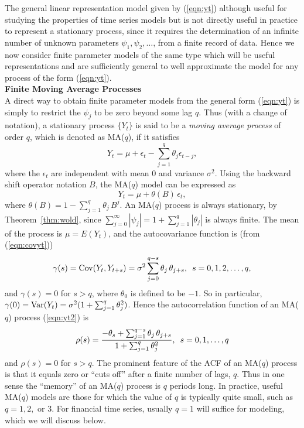 The general linear representation model given by (\ref{eqn:yt}) although useful for studying the properties of time series models but is not directly useful in practice to represent a stationary process, since it requires the determination of an infinite number of unknown parameters $\psi_1,\psi_2, \ldots$, from a finite record of data. Hence we now consider finite parameter models of the same type which will be useful representations and are sufficiently general to well approximate the model for any process of the form (\ref{eqn:yt}). \\


\noindent \textbf{Finite Moving Average Processes} \\


A direct way to obtain finite parameter models from the general form (\ref{eqn:yt}) is simply to restrict the $\psi_j$ to be zero beyond some lag $q$. Thus (with a change of notation), a stationary process $\{Y_t\}$ is said to be a \textit{moving average process} of order $q$, which is denoted as MA($q$), if it satisfies
	\begin{equation}\label{eqn:yt2}
	Y_t = \mu + \epsilon_t - \sum_{j=1}^{q} \theta_j \epsilon_{t-j},
	\end{equation}
where the $\epsilon_t$ are independent with mean 0 and variance $\sigma^2$. Using the backward shift operator notation $B$, the MA($q$) model can be expressed as
	\begin{equation*}
         Y_t= \mu + \theta(B) \, \epsilon_t,	
	\end{equation*}
where $\theta(B) = 1 - \sum_{j=1}^q \theta_j \, B^j$.  An MA($q$)  process is always stationary, by Theorem~\ref{thm:wold}, since $\sum_{j=0}^{\infty} |\psi_j|= 1 + \sum_{j=1}^q |\theta_j|$ is always finite. The mean of the process is $\mu = E(Y_t)$, and the autocovariance function is (from (\ref{eqn:covyt}))
	\begin{equation*}
            \gamma(s)= \text{Cov}(Y_t, Y_{t+s})= \sigma^2 \sum_{j=0}^{q-s} \theta_j \, \theta_{j+s}, \enskip s = 0, 1, 2, \ldots, q,	
	\end{equation*}
and $\gamma(s)=0$ for $s>q$, where $\theta_0$ is defined to be $-1$. So in particular, $\gamma(0)= \operatorname{Var}(Y_t) = \sigma^2 (1 + \sum_{j=1}^q \theta_j^2)$. Hence the autocorrelation function of an MA($q$) process (\ref{eqn:yt2}) is
       \begin{equation}\label{eqn:rhos}
	\rho(s) = \dfrac{-\theta_s + \sum_{j=1}^{q-s} \theta_j \, \theta_{j+s}}{1 + \sum_{j=1}^q \theta_j^2}, \enskip s = 0,1,\ldots, q
       \end{equation}
and $\rho(s)=0$ for $s>q$. The prominent feature of the ACF of an MA($q$) process is that it equals zero or ``cuts off'' after a finite number of lags, $q$. Thus in one sense the ``memory'' of an MA($q$) process is $q$ periods long. In practice, useful MA($q$) models are those for which the value of $q$ is typically quite small, such as $q=1,2,$ or $3$.  For financial time series, usually $q=1$ will suffice for modeling, which we will discuss below. 


